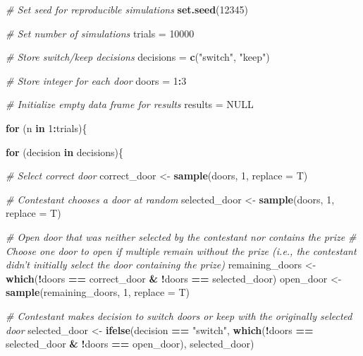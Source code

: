 \documentclass[]{book}
\newenvironment{Shaded}{\begin{snugshade}}{\end{snugshade}}
\newcommand{\CommentTok}[1]{\textcolor[rgb]{0.56,0.35,0.01}{\textit{#1}}}
\newcommand{\ControlFlowTok}[1]{\textcolor[rgb]{0.13,0.29,0.53}{\textbf{#1}}}
\newcommand{\DataTypeTok}[1]{\textcolor[rgb]{0.13,0.29,0.53}{#1}}
\newcommand{\DecValTok}[1]{\textcolor[rgb]{0.00,0.00,0.81}{#1}}
\newcommand{\KeywordTok}[1]{\textcolor[rgb]{0.13,0.29,0.53}{\textbf{#1}}}
\newcommand{\NormalTok}[1]{#1}
\newcommand{\OperatorTok}[1]{\textcolor[rgb]{0.81,0.36,0.00}{\textbf{#1}}}
\newcommand{\OtherTok}[1]{\textcolor[rgb]{0.56,0.35,0.01}{#1}}
\newcommand{\StringTok}[1]{\textcolor[rgb]{0.31,0.60,0.02}{#1}}
\begin{document}
\begin{Shaded}
\begin{Highlighting}[]
\CommentTok{# Set seed for reproducible simulations}
\KeywordTok{set.seed}\NormalTok{(}\DecValTok{12345}\NormalTok{)}

\CommentTok{# Set number of simulations}
\NormalTok{trials =}\StringTok{ }\DecValTok{10000}

\CommentTok{# Store switch/keep decisions}
\NormalTok{decisions =}\StringTok{ }\KeywordTok{c}\NormalTok{(}\StringTok{"switch"}\NormalTok{, }\StringTok{"keep"}\NormalTok{)}

\CommentTok{# Store integer for each door}
\NormalTok{doors =}\StringTok{ }\DecValTok{1}\OperatorTok{:}\DecValTok{3}

\CommentTok{# Initialize empty data frame for results}
\NormalTok{results =}\StringTok{ }\OtherTok{NULL}

\ControlFlowTok{for}\NormalTok{ (n }\ControlFlowTok{in} \DecValTok{1}\OperatorTok{:}\NormalTok{trials)\{}
  
  \ControlFlowTok{for}\NormalTok{ (decision }\ControlFlowTok{in}\NormalTok{ decisions)\{}
    
    \CommentTok{# Select correct door}
\NormalTok{    correct_door <-}\StringTok{ }\KeywordTok{sample}\NormalTok{(doors, }\DecValTok{1}\NormalTok{, }\DataTypeTok{replace =}\NormalTok{ T)}

    \CommentTok{# Contestant chooses a door at random}
\NormalTok{    selected_door <-}\StringTok{ }\KeywordTok{sample}\NormalTok{(doors, }\DecValTok{1}\NormalTok{, }\DataTypeTok{replace =}\NormalTok{ T)}
  
    \CommentTok{# Open door that was neither selected by the contestant nor contains the prize}
    \CommentTok{# Choose one door to open if multiple remain without the prize (i.e., the contestant didn't initially select the door containing the prize)}
\NormalTok{    remaining_doors <-}\StringTok{ }\KeywordTok{which}\NormalTok{(}\OperatorTok{!}\NormalTok{doors }\OperatorTok{==}\StringTok{ }\NormalTok{correct_door }\OperatorTok{&}\StringTok{ }\OperatorTok{!}\NormalTok{doors }\OperatorTok{==}\StringTok{ }\NormalTok{selected_door)}
\NormalTok{    open_door <-}\StringTok{ }\KeywordTok{sample}\NormalTok{(remaining_doors, }\DecValTok{1}\NormalTok{, }\DataTypeTok{replace =}\NormalTok{ T) }
  
    \CommentTok{# Contestant makes decision to switch doors or keep with the originally selected door}
\NormalTok{    selected_door <-}\StringTok{ }\KeywordTok{ifelse}\NormalTok{(decision }\OperatorTok{==}\StringTok{ "switch"}\NormalTok{, }\KeywordTok{which}\NormalTok{(}\OperatorTok{!}\NormalTok{doors }\OperatorTok{==}\StringTok{ }\NormalTok{selected_door }\OperatorTok{&}\StringTok{ }\OperatorTok{!}\NormalTok{doors }\OperatorTok{==}\StringTok{ }\NormalTok{open_door), selected_door)}
    

\end{Highlighting}
\end{Shaded}
\end{document}
